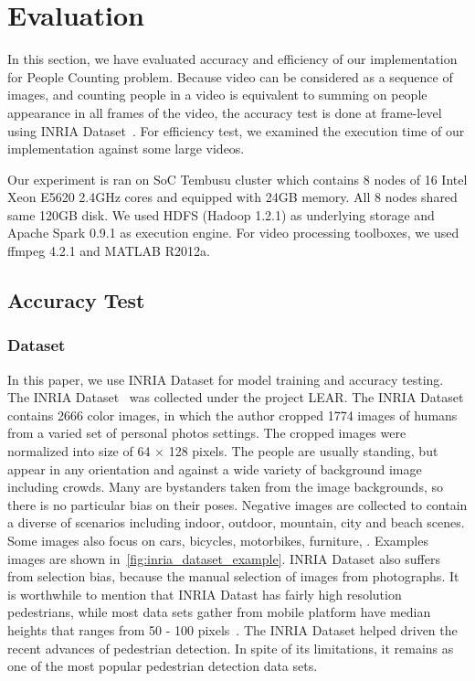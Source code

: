 \section{Evaluation}
\label{sec:sec_experiment}
In this section, we have evaluated accuracy and efficiency of our implementation
for People Counting problem. Because video can be considered as a sequence of
images, and counting people in a video is equivalent to summing on people
appearance in all frames of the video, the accuracy test is done at frame-level
using INRIA Dataset~\cite{2005_CVPR_Dalal}. For efficiency test, we examined the
execution time of our implementation against some large videos.

Our experiment is ran on SoC Tembusu cluster which contains 8 nodes of 16
Intel Xeon E5620 2.4GHz cores and equipped with 24GB memory. All 8 nodes shared
same 120GB disk. We used HDFS (Hadoop 1.2.1) as underlying storage and Apache
Spark 0.9.1 as execution engine. For video processing toolboxes, we used ffmpeg
4.2.1 and MATLAB R2012a.

\subsection{Accuracy Test}
\subsubsection{Dataset}
In this paper, we use INRIA Dataset for model training and accuracy testing. 
The INRIA Dataset~\cite{2005_CVPR_Dalal} was collected under the project LEAR.
The INRIA Dataset contains 2666 color images, in which the author cropped 1774
images of humans from a varied set of personal photos settings. The cropped
images were normalized into size of 64 $\times$ 128 pixels. The people are
usually standing, but appear in any orientation and against a wide variety of 
background image including crowds. Many are bystanders taken from the image
backgrounds, so there is no particular bias on their poses. Negative images are
collected to contain a diverse of scenarios including indoor, outdoor, mountain,
city and beach scenes. Some images also focus on cars, bicycles, motorbikes,
furniture, \etc.
Examples images are shown in~\fig\ref{fig:inria_dataset_example}.
INRIA Dataset also suffers from selection bias, because the manual selection of
images from photographs. It is worthwhile to mention that INRIA Datast has
fairly high resolution pedestrians, while most data sets gather from mobile
platform have median heights that ranges from 50 - 100
pixels~\cite{2012_PAMI_Dollar}. The INRIA Dataset helped driven the recent
advances of pedestrian detection. In spite of its limitations, it remains as one
of the most popular pedestrian detection data sets. 

